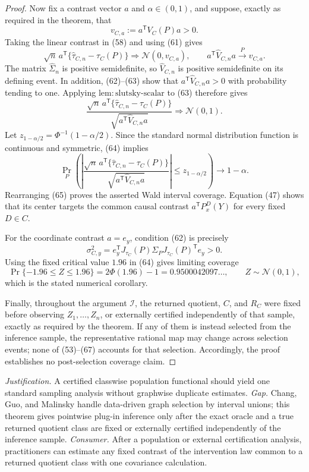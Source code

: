 \documentclass{article}
\begin{document}
\begin{proof}
Now fix a contrast vector \(a\) and \(\alpha\in(0,1)\), and suppose, exactly as required in the theorem, that
\[
 v_{C,a}:=a^{\mathsf T}V_C(P)a>0. \tag{62}
\]
Taking the linear contrast in (58) and using (61) gives
\[
 \sqrt n\,a^{\mathsf T}\{\widehat\tau_{C,n}-\tau_C(P)\}
 \Rightarrow\mathcal N(0,v_{C,a}),
 \qquad
 a^{\mathsf T}\widehat V_{C,n}a\xrightarrow{P}v_{C,a}. \tag{63}
\]
The matrix \(\widehat\Sigma_n\) is positive semidefinite, so \(\widehat V_{C,n}\) is positive semidefinite on its defining event.  In addition, (62)--(63) show that \(a^{\mathsf T}\widehat V_{C,n}a>0\) with probability tending to one.  Applying \(\mathrm{lem{:}slutsky\text{-}scalar}\) to (63) therefore gives
\[
 \frac{\sqrt n\,a^{\mathsf T}\{\widehat\tau_{C,n}-\tau_C(P)\}}
 {\sqrt{a^{\mathsf T}\widehat V_{C,n}a}}
 \Rightarrow\mathcal N(0,1). \tag{64}
\]
Let \(z_{1-\alpha/2}=\Phi^{-1}(1-\alpha/2)\).  Since the standard normal distribution function is continuous and symmetric, (64) implies
\[
 \Pr_P\!\left(
 \left|
 \frac{\sqrt n\,a^{\mathsf T}\{\widehat\tau_{C,n}-\tau_C(P)\}}
 {\sqrt{a^{\mathsf T}\widehat V_{C,n}a}}
 \right|
 \leq z_{1-\alpha/2}
 \right)
 \longrightarrow 1-\alpha. \tag{65}
\]
Rearranging (65) proves the asserted Wald interval coverage.  Equation (47) shows that its center targets the common causal contrast \(a^{\mathsf T}P_x^D(Y)\) for every fixed \(D\in C\).

For the coordinate contrast \(a=e_y\), condition (62) is precisely
\[
 \sigma_{C,y}^2
 =e_y^{\mathsf T}J_{\tau_C}(P)\Sigma_PJ_{\tau_C}(P)^{\mathsf T}e_y>0. \tag{66}
\]
Using the fixed critical value \(1.96\) in (64) gives limiting coverage
\[
 \Pr\{-1.96\leq Z\leq1.96\}
 =2\Phi(1.96)-1
 =0.9500042097\ldots,
 \qquad Z\sim\mathcal N(0,1), \tag{67}
\]
which is the stated numerical corollary.

Finally, throughout the argument \(\mathcal I\), the returned quotient, \(C\), and \(R_C\) were fixed before observing \(Z_1,\ldots,Z_n\), or externally certified independently of that sample, exactly as required by the theorem.  If any of them is instead selected from the inference sample, the representative rational map may change across selection events; none of (53)--(67) accounts for that selection.  Accordingly, the proof establishes no post-selection coverage claim.
\end{proof}
\par\smallskip\noindent \textit{Justification.} A certified classwise population functional should yield one standard sampling analysis without graphwise duplicate estimates. \textit{Gap.} Chang, Guo, and Malinsky handle data-driven graph selection by interval unions; this theorem gives pointwise plug-in inference only after the exact oracle and a true returned quotient class are fixed or externally certified independently of the inference sample. \textit{Consumer.} After a population or external certification analysis, practitioners can estimate any fixed contrast of the intervention law common to a returned quotient class with one covariance calculation.
\end{document}
